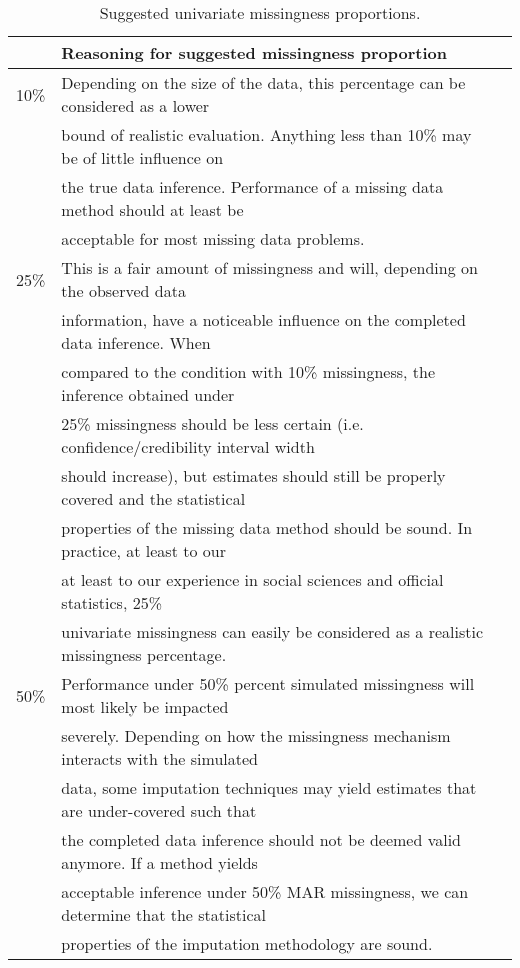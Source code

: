 \documentclass[bimj,fleqn]{w-art}
\begin{document}
\begin{table}[htb]
\begin{center}
\caption{Suggested univariate missingness proportions.}
\label{table:prop}
\begin{tabular}{lll}
\hline
      & Reasoning for suggested missingness proportion \\
\hline  
10\%  & Depending on the size of the data, this percentage can be considered as a lower \\
      & bound of realistic evaluation. Anything less than 10\% may be of little influence on \\
      & the true data inference. Performance of a missing data method should at least be \\
      & acceptable for most missing data problems. \\ \noalign{\smallskip} %
25\%  & This is a fair amount of missingness and will, depending on the observed data \\
      & information, have a noticeable influence on the completed data inference. When \\
      & compared to the condition with 10\% missingness, the inference obtained under \\
      & 25\% missingness should be less certain (i.e. confidence/credibility interval width \\
      & should increase), but estimates should still be properly covered and the statistical \\
      & properties of the missing data method should be sound. In practice, at least to our \\
      & at least to our experience in social sciences and official statistics, 25\% \\
      & univariate missingness can easily be considered as a realistic missingness percentage. \\ \noalign{\smallskip} %
50\%  & Performance under 50\% percent simulated missingness will most likely be impacted \\ 
      & severely. Depending on how the missingness mechanism interacts with the simulated \\
      & data, some imputation techniques may yield estimates that are under-covered such that \\
      & the completed data inference should not be deemed valid anymore. If a method yields \\
      & acceptable inference under 50\% MAR missingness, we can determine that the statistical \\
      & properties of the imputation methodology are sound. \\
\hline
\end{tabular}
\end{center}
\end{table}
\end{document}
